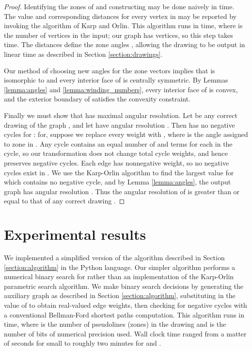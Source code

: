 \documentclass[11pt,letter]{article}
\begin{document}
\begin{proof}
Identifying the zones of  and constructing  may be done naively in  time.  The value  and corresponding distances  for every vertex  in  may be reported by invoking the algorithm of Karp and Orlin.  This algorithm runs in  time, where  is the number of vertices in the input; our graph  has  vertices, so this step takes  time.  The  distances define the zone angles , allowing the drawing  to be output in linear time as described in Section \ref{section:drawings}.

Our method of choosing new angles for the zone vectors implies that  is isomorphic to  and every interior face of  is centrally symmetric.  By Lemmas \ref{lemma:angles} and \ref{lemma:winding_numbers}, every interior face of  is convex, and the exterior boundary of  satisfies the convexity constraint.

Finally we must show that  has maximal angular resolution.  Let  be any correct drawing of the graph , and let  have angular resolution .  Then  has no negative cycles for : for, suppose we replace every weight  with , where  is the angle assigned to zone  in .  Any cycle contains an equal number of  and  terms for each  in the cycle, so our transformation does not change total cycle weights, and hence preserves negative cycles.   Each edge has nonnegative weight, so no negative cycles exist in .  We use the Karp-Orlin algorithm to find the largest value  for which  contains no negative cycle, and by Lemma \ref{lemma:angles}, the output graph  has angular resolution .  Thus the angular resolution of  is greater than or equal to that of any correct drawing .
\end{proof}

\section{Experimental results}

We implemented a simplified version of the algorithm described in Section \ref{section:algorithm} in the Python language.  Our simpler algorithm performs a numerical binary search for  rather than an implementation of the Karp-Orlin parametric search algorithm.  We make binary search decisions by generating the auxiliary graph as described in Section \ref{section:algorithm}, substituting in the value of  to obtain real-valued edge weights, then checking for negative cycles with a conventional Bellman-Ford shortest paths computation.  This algorithm runs in  time, where  is the number of pseudolines (zones) in the drawing and  is the number of bits of numerical precision used.  Wall clock time ranged from a matter of seconds for small  to roughly two minutes for  and .
\end{document}
